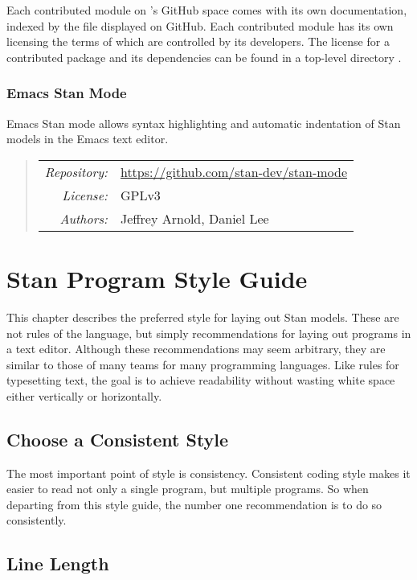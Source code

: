 Each contributed module on 's GitHub space comes with
its own documentation, indexed by the  file displayed
on GitHub.  Each contributed module has its own licensing the terms of
which are controlled by its developers.  The license for a contributed
package and its dependencies can be found in a top-level directory
.

\subsection{Emacs Stan Mode}

\noindent
Emacs Stan mode allows syntax highlighting and automatic indentation
of Stan models in the Emacs text editor.

\begin{quote}
\begin{tabular}{rl}
{\it Repository:} & \url{https://github.com/stan-dev/stan-mode}
\\[4pt]
{\it License:} & GPLv3
\\[4pt]
{\it Authors:} & Jeffrey Arnold, Daniel Lee
\end{tabular}
\end{quote}

\chapter{Stan Program Style Guide}

\noindent
This chapter describes the preferred style for laying out Stan
models. These are not rules of the language, but simply
recommendations for laying out programs in a text editor.  Although
these recommendations may seem arbitrary, they are similar to those of
many teams for many programming languages.  Like rules for typesetting
text, the goal is to achieve readability without wasting white space
either vertically or horizontally.

\section{Choose a Consistent Style}

The most important point of style is consistency.  Consistent coding
style makes it easier to read not only a single program, but multiple
programs.  So when departing from this style guide, the number one
recommendation is to do so consistently.

\section{Line Length}

